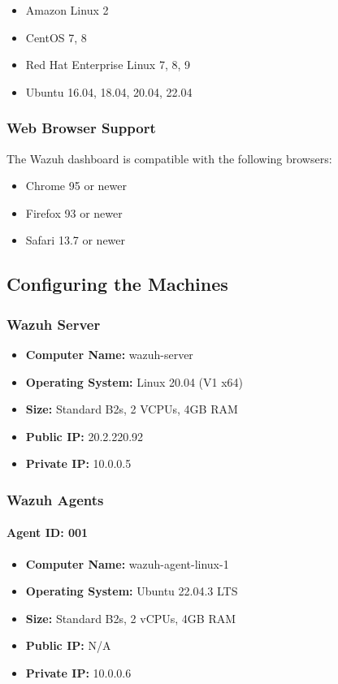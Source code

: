 \begin{itemize}
\item Amazon Linux 2
\item CentOS 7, 8
\item Red Hat Enterprise Linux 7, 8, 9
\item Ubuntu 16.04, 18.04, 20.04, 22.04
\end{itemize}

\subsubsection{Web Browser Support}

The Wazuh dashboard is compatible with the following browsers:

\begin{itemize}
\item Chrome 95 or newer
\item Firefox 93 or newer
\item Safari 13.7 or newer
\end{itemize}

\subsection{Configuring the Machines}

\subsubsection{Wazuh Server}
\begin{itemize}
    \item \textbf{Computer Name:} wazuh-server
    \item \textbf{Operating System:} Linux 20.04 (V1 x64)
    \item \textbf{Size:} Standard B2s, 2 VCPUs, 4GB RAM
    \item \textbf{Public IP:} 20.2.220.92
    \item \textbf{Private IP:} 10.0.0.5
\end{itemize}

\subsubsection{Wazuh Agents}
\label{installed-agents}
\paragraph*{Agent ID: 001}
\begin{itemize}
    \item \textbf{Computer Name:} wazuh-agent-linux-1
    \item \textbf{Operating System:} Ubuntu 22.04.3 LTS
    \item \textbf{Size:} Standard B2s, 2 vCPUs, 4GB RAM
    \item \textbf{Public IP:} N/A
    \item \textbf{Private IP:} 10.0.0.6
\end{itemize}

